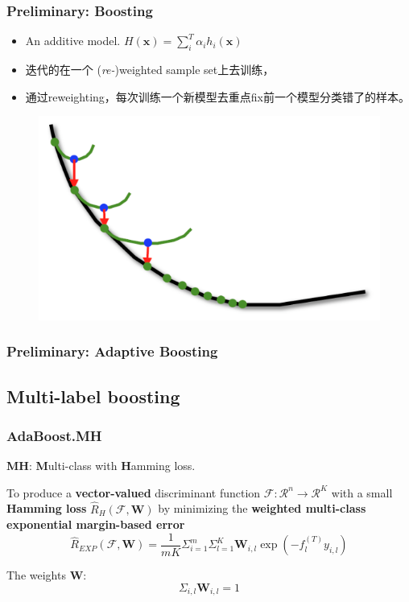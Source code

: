 \documentclass{beamer}
\begin{document}
\begin{frame}
\frametitle{Preliminary: Boosting}
\begin{itemize}
\item An additive model. $H(\mathbf{x}) = \sum_i^T \alpha_i h_i(\mathbf{x})$
\item 迭代的在一个 (\textit{re-})weighted sample set上去训练，
\item 通过reweighting，每次训练一个新模型去重点fix前一个模型分类错了的样本。
\end{itemize}

\begin{figure}
\includegraphics[width=.5\linewidth]{img/boosting.png}
\end{figure}
\end{frame}

\begin{frame}
\frametitle{Preliminary: Adaptive Boosting}

\begin{algorithm}[H]
\end{algorithm}

\end{frame}

\subsection{Multi-label boosting}

\begin{frame}
\frametitle{AdaBoost.MH}
\begin{block}{}
\textbf{MH}: \textbf{M}ulti-class with \textbf{H}amming loss.
\end{block}
To produce a \textbf{vector-valued} discriminant function $\mathcal{F} : \mathcal{R}^n \rightarrow \mathcal{R}^K$ with a small \textbf{Hamming loss} $\hat{R}_H (\mathcal{F}, \mathbf{W})$ by minimizing the \textbf{weighted multi-class exponential margin-based error}
$$\hat{R}_{EXP}(\mathcal{F}, \mathbf{W}) = \frac{1}{mK} {{\Sigma}_{i=1}^m} {{\Sigma}_{l=1}^K} {\mathbf{W}_{i,l}\exp(- f_l^{(T)} y_{i,l})}$$

The weights $\mathbf{W}$:
$${\Sigma}_{i,l} \mathbf{W}_{i, l} = 1$$
\end{frame}
\end{document}

